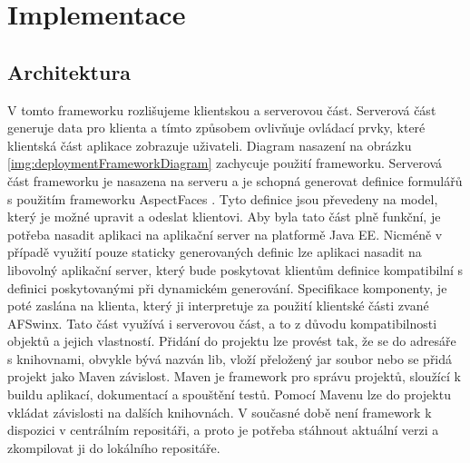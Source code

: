 \chapter{Implementace} 
\section{Architektura}
V tomto frameworku \cite{framework} rozlišujeme klientskou a serverovou část. Serverová část generuje data pro klienta a tímto způsobem ovlivňuje ovládací prvky, které klientská část aplikace zobrazuje uživateli. Diagram nasazení na obrázku \ref{img:deploymentFrameworkDiagram} zachycuje použití frameworku. Serverová část frameworku je nasazena na serveru a je schopná generovat definice formulářů s použitím frameworku AspectFaces \cite{aspectFaces}. Tyto definice jsou převedeny na model, který je možné upravit a odeslat klientovi. Aby byla tato část plně funkční, je potřeba nasadit aplikaci na aplikační server na platformě Java EE. Nicméně v případě využití pouze staticky generovaných definic lze aplikaci nasadit na libovolný aplikační server, který bude poskytovat klientům definice kompatibilní s definici poskytovanými při dynamickém generování. Specifikace komponenty, je poté zaslána na klienta, který ji interpretuje za použití klientské části zvané AFSwinx. Tato část využívá i serverovou část, a to z důvodu kompatibilnosti objektů a jejich vlastností. Přidání do projektu lze provést tak, že se do adresáře s knihovnami, obvykle bývá nazván lib, vloží přeložený jar soubor nebo se přidá projekt jako Maven závislost. Maven \cite{maven} je framework pro správu projektů, sloužící k buildu aplikací, dokumentací a spouštění testů. Pomocí Mavenu lze do projektu vkládat závislosti na dalších knihovnách. V současné době není framework k dispozici v centrálním repositáři, a proto je potřeba stáhnout aktuální verzi a zkompilovat ji do lokálního repositáře. 
